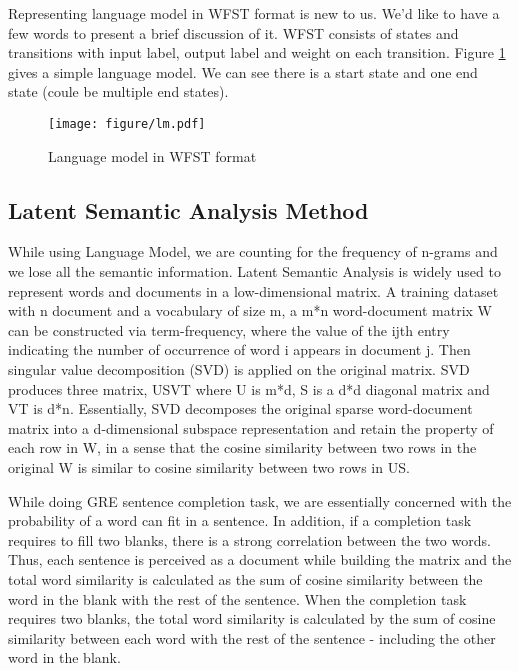 \documentclass[11pt]{article}
\begin{document}
Representing language model in WFST\cite{Mohri:08} format is new to us. We'd like to have a few words to present a brief discussion of it. WFST consists of states and transitions with input label, output label and weight on each transition. Figure \ref{fig:lm} gives a simple language model. We can see there is a start state and one end state (coule be multiple end states).

\begin{figure}[t]
\centering
\texttt{[image: figure/lm.pdf]}
\caption{Language model in WFST format}
\label{fig:lm}
\end{figure}

\subsection{Latent Semantic Analysis Method}
While using Language Model, we are counting for the frequency of n-grams and we lose all the semantic information. Latent Semantic Analysis is widely used to represent words and documents in a low-dimensional matrix. A training dataset with n document and a vocabulary of size m, a m*n word-document matrix W can be constructed via term-frequency, where the value of the ijth entry indicating the number of occurrence of word i appears in document j. Then singular value decomposition (SVD) is applied on the original matrix. SVD produces three matrix, USVT where U is m*d, S is a d*d diagonal matrix and VT is d*n. Essentially, SVD decomposes the original sparse word-document matrix into a d-dimensional subspace representation and retain the property of each row in W, in a sense that the cosine similarity between two rows in the original W is similar to cosine similarity between two rows in US. 

While doing GRE sentence completion task, we are essentially concerned with the probability of a word can fit in a sentence. In addition, if a completion task requires to fill two blanks, there is a strong correlation between the two words. Thus, each sentence is perceived as a document while building the matrix and the total word similarity is calculated as the sum of cosine similarity between the word in the blank with the rest of the sentence. When the completion task requires two blanks, the total word similarity is calculated by the sum of cosine similarity between each word with the rest of the sentence - including the other word in the blank.
\end{document}
